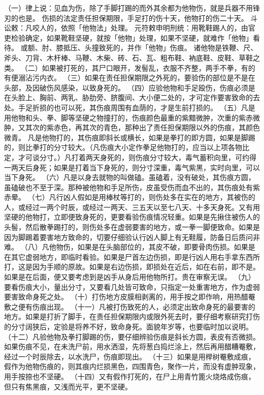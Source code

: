 \documentclass[12pt,UTF8]{ctexbook}
\begin{document}
（一）律上说：见血为伤，除了手脚打踢的而外其余都为他物伤，就是兵器不用锋刃的也是。
伤损的法定责任担保期限，手足打的伤十天，他物打的伤二十天。
斗讼敕：凡咬人的，依照「他物法」处理。
元符敕申明刑统：用靴鞋踢人的，由官吏检验确定，如果靴鞋坚硬，就按「他物」处理，如果不坚硬，就难作「他物」看待。
或额、肘、膝抵压、头撞致死的，并作「他物」伤痕。
诸他物是铁鞭、尺、斧头、刀背、木杆棒、马鞭、木柴、砖、石、瓦、粗布鞋、衲底鞋、皮鞋、草鞋之类。
（二）如果被打死的，其尸口眼开，发髻乱，衣服不齐整，两手不拳，有的有便溺沾污内衣。
（三）如果在责任担保期限之外死的，要验伤的部位是不是在头部，及因破伤风感染，以致身死的。
（四）应验他物和手足殴伤，伤痕必须是在头脸上、胸前、两乳、胁肋旁、脐腹间、大小便二处的，才可定作要害致命的去处。手足折损的也可以死，其伤痕周围有血荫的，才是生前打损的。
（五）凡是用他物和头、拳、脚等坚硬之物撞打的，伤痕颜色最重的紫黯微肿，次重的紫赤微肿，又其次的紫赤色，再其次的青色，那种出了责任担保期限以外的伤痕，其颜色微青。
凡是他物打的，其伤痕即斜长或横长，如果是拳打的即方圆，如果是脚踢的，则比拳打的分寸较大。（凡伤痕大小定作拳足他物打的，应当以上项各物比定，才可谈分寸。）凡打着两天身死的，则伤痕分寸较大，毒气蓄积向里，可约得一两天后身死；如果是打着当下身死的，则分寸深重，毒气紫黑，实时向里，可以当下身死。
（六）凡是以身去就物的叫做磕。虽磕着，没有破处，其伤痕方圆，虽磕破也不至于深。那种被他物和手足所伤，皮虽受伤而血不出的，其伤痕处有紫赤晕。
（七）凡行凶人假如是用棒杖等打的，则伤处多在实在的地方，其被伤的人，或经过一两个时辰，或经过一两天、三五天以至七八天、十多天身死。又有用坚硬的他物打，立即便致身死的，更要看验伤痕情况轻重。如果是先揪住被伤人的头髻，然后散拳踢打的，则伤处多在虚弱要害的地方，或一拳一脚便致命。如果是因为脚踢着要害地方致命的，切要仔细验认行凶人脚上有无鞋履，防备日后质问非难。
（八）凡他物伤，如果是在头脑部位的，其皮不破，即要骨肉伤损。如果是在其它虚弱地方，即临时看验。如果是尸首左边伤损，即是行凶人用右手拿东西所打，这是因为手顺的原故。如果是右边伤损，即损处在近后，如在右前，即不是。如果是在后面，便又要考虑到是凶手从身后用他物所打。贵在审察无误。
（九）要看伤痕大小，量出分寸，又要看几处皆可致命，只指定一处重害地方，作为虚弱要害致命身死之处。
（十）打伤地方皮膜相剥离的，用手按之即作响，用热醋罨敷之便有伤痕出现。
（十一）凡被打伤致死的人，必须定出致命身死的最要害的地方。如果是打折了脚手，在责任担保期限内或限外死去时，要仔细考察研究打伤的分寸阔狭后，定验是将养不好，致命身死。面貌年岁等，也要临时加以说明。
（十二）凡验他物及拳打脚踢的伤，要仔细辨验伤痕是斜长方圆，表皮有否微损。如果伤痕不见，在未洗尸前，用水洒湿，先将葱白捣烂涂上，然后再用醋糟罨敷，经过一个时辰除去，以水洗尸，伤痕即现出。
（十三）如果是用榉树罨敷成痕，假作为他物伤痕的，则其痕内烂损黑色，四围青色，聚作一片，而没有虚肿现象，用手按捺也不坚硬。
（十四）又有假作打死的，在尸上用青竹篦火烧烙成伤痕，但只有焦黑痕，又浅而光平，更不坚硬。
\end{document}
